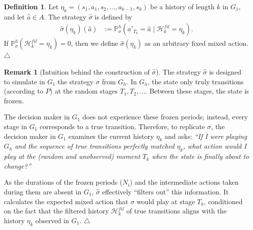 \documentclass[english,openary,11pt]{article}
\newcommand\xqed[1]{%
  \leavevmode\unskip\penalty9999 \hbox{}\nobreak\hfill
  \quad\hbox{#1}}
\newcommand\demo{\xqed{$\triangle$}}
\theoremstyle{definition}
\newtheorem{remark}{Remark}
\newtheorem{definition}{Definition}
\newcommand{\E}{\mathbb{E}}
\renewcommand{\P}{\mathbb{P}}
\begin{document}
\begin{definition}
Let $\eta_k = (s_1, a_1, s_2, \ldots, a_{k-1}, s_{k})$ be a history of length $k$ in $G_1$, and let $\widehat a \in A$. The strategy $\widehat{\sigma}$ is defined by
\begin{align*}
\widehat{\sigma}(\eta_k)(\widehat a)
&:=
\P^h_\sigma(a'_{T_k} = \widehat a \mid \mathcal H^{fil}_k = \eta_k).
\end{align*}
If $\P^h_\sigma(\mathcal H^{fil}_k = \eta_k) = 0$, then we define $\widehat{\sigma}(\eta_k)$ as an arbitrary fixed mixed action. \demo
\end{definition}

\begin{remark}[Intuition behind the construction of $\widehat{\sigma}$]
The strategy $\widehat{\sigma}$ is designed to simulate in $G_1$ the strategy $\sigma$ from $G_h$. In $G_h$, the state only truly transitions (according to $P$) at the random stages $T_1, T_2, \ldots$. Between these stages, the state is frozen.

The decision maker in $G_1$ does not experience these frozen periods; instead, every stage in $G_1$ corresponds to a true transition. Therefore, to replicate $\sigma$, the decision maker in $G_1$ examines the current history $\eta_k$ and asks: \textit{``If I were playing $G_h$ and the sequence of true transitions perfectly matched $\eta_k$, what action would I play at the (random and unobserved) moment $T_k$ when the state is finally about to change?''}

As the durations of the frozen periods ($N_i$) and the intermediate actions taken during them are absent in $G_1$, $\widehat{\sigma}$ effectively ``filters out'' this information. It calculates the expected mixed action that $\sigma$ would play at stage $T_k$, conditioned on the fact that the filtered history $\mathcal{H}^{fil}_k$ of true transitions aligns with the history $\eta_k$ observed in $G_1$. \demo
\end{remark}

\end{document}
